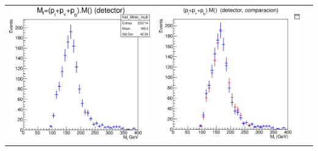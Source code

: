 \documentclass[10pt]{beamer}
\begin{document}
\begin{frame}
\begin{center}
\begin{tabular}{ccc}
\includegraphics[scale=0.18]{plot-mt-reco-det.eps} &
			\includegraphics[scale=0.18]{plot-mt-reco-det-comparacions.eps} 
			
			
			
		\end{tabular}
	\end{center}
\end{frame}
\end{document}

